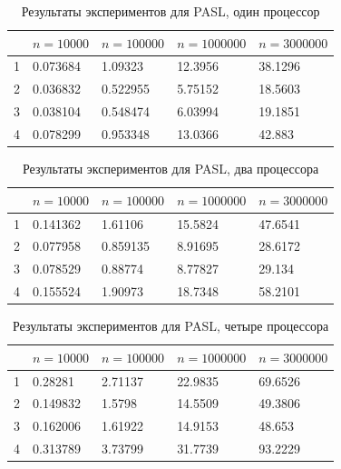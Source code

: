 \documentclass[specification,annotation]{itmo-student-thesis}
\begin{document}
\begin{table}[!ht]
\centering
\begin{tabular}{|l|l|l|l|l|}\hline
 & $n=10000$ & $n=100000$ & $n=1000000$ & $n=3000000$ \\\hline
1 & 0.073684 & 1.09323 & 12.3956 & 38.1296 \\\hline
2 & 0.036832 & 0.522955 & 5.75152 & 18.5603 \\\hline
3 & 0.038104 & 0.548474 & 6.03994 & 19.1851 \\\hline
4 & 0.078299 & 0.953348 & 13.0366 & 42.883 \\\hline
\end{tabular}
\caption{Результаты экспериментов для PASL, один процессор}\label{tbl:results-pasl-1}
\end{table}

\begin{table}[!ht]
\centering
\begin{tabular}{|l|l|l|l|l|}\hline
 & $n=10000$ & $n=100000$ & $n=1000000$ & $n=3000000$ \\\hline
1 & 0.141362 & 1.61106 & 15.5824 & 47.6541 \\\hline
2 & 0.077958 & 0.859135 & 8.91695 & 28.6172 \\\hline
3 & 0.078529 & 0.88774 & 8.77827 & 29.134 \\\hline
4 & 0.155524 & 1.90973 & 18.7348 & 58.2101 \\\hline
\end{tabular}
\caption{Результаты экспериментов для PASL, два процессора}\label{tbl:results-pasl-2}
\end{table}

\begin{table}[!ht]
\centering
\begin{tabular}{|l|l|l|l|l|}\hline
 & $n=10000$ & $n=100000$ & $n=1000000$ & $n=3000000$ \\\hline
1 & 0.28281  & 2.71137 & 22.9835 & 69.6526 \\\hline
2 & 0.149832 & 1.5798 & 14.5509 & 49.3806 \\\hline
3 & 0.162006 & 1.61922 & 14.9153 & 48.653 \\\hline
4 & 0.313789 & 3.73799 & 31.7739 & 93.2229 \\\hline
\end{tabular}
\caption{Результаты экспериментов для PASL, четыре процессора}\label{tbl:results-pasl-4}
\end{table}
\end{document}

